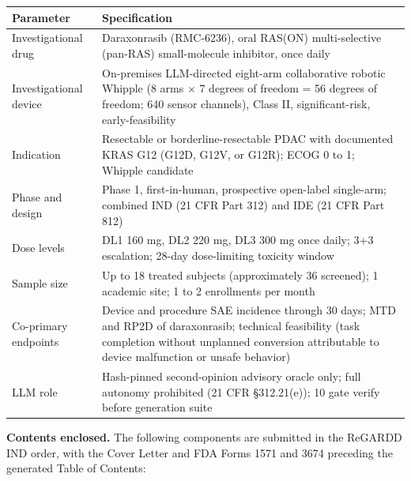 \noindent\begin{tabularx}{\textwidth}{L{3.7cm} Y}
\toprule
\textbf{Parameter} & \textbf{Specification} \\
\midrule
Investigational drug & Daraxonrasib (RMC-6236), oral RAS(ON) multi-selective (pan-RAS) small-molecule inhibitor, once daily \\
Investigational device & On-premises LLM-directed eight-arm collaborative robotic Whipple (8 arms $\times$ 7 degrees of freedom = 56 degrees of freedom; 640 sensor channels), Class II, significant-risk, early-feasibility \\
Indication & Resectable or borderline-resectable PDAC with documented KRAS G12 (G12D, G12V, or G12R); ECOG 0 to 1; Whipple candidate \\
Phase and design & Phase 1, first-in-human, prospective open-label single-arm; combined IND (21 CFR Part 312) and IDE (21 CFR Part 812) \\
Dose levels & DL1 160 mg, DL2 220 mg, DL3 300 mg once daily; 3+3 escalation; 28-day dose-limiting toxicity window \\
Sample size & Up to 18 treated subjects (approximately 36 screened); 1 academic site; 1 to 2 enrollments per month \\
Co-primary endpoints & Device and procedure SAE incidence through 30 days; MTD and RP2D of daraxonrasib; technical feasibility (task completion without unplanned conversion attributable to device malfunction or unsafe behavior) \\
LLM role & Hash-pinned second-opinion advisory oracle only; full autonomy prohibited (21 CFR \S 312.21(e)); 10 gate verify before generation suite \\
\bottomrule
\end{tabularx}
\vspace{-0.55cm}

\clearpage

\noindent\textbf{Contents enclosed.} The following components are submitted in the ReGARDD IND order, with the Cover Letter and FDA Forms 1571 and 3674 preceding the generated Table of Contents:

